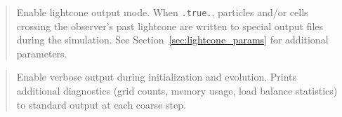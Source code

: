 \begin{quote}
Enable lightcone output mode.  When \texttt{.true.}, particles and/or
cells crossing the observer's past lightcone are written to special
output files during the simulation.  See
Section~\ref{sec:lightcone_params} for additional parameters.
\end{quote}

\label{param:verbose}

\begin{quote}
Enable verbose output during initialization and evolution.  Prints
additional diagnostics (grid counts, memory usage, load balance
statistics) to standard output at each coarse step.
\end{quote}

\label{param:jobcontrolfile}

